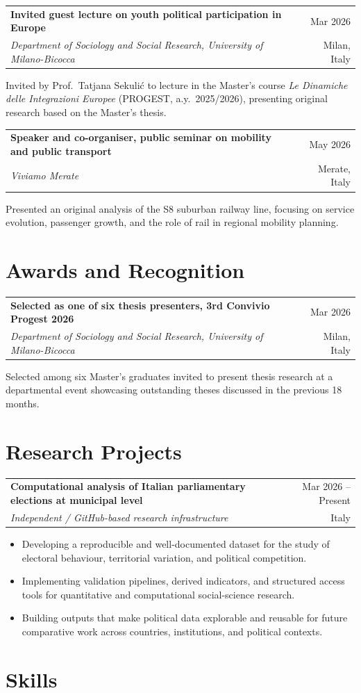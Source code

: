 \documentclass[11pt,a4paper]{article}
\makeatletter
\newcommand{\cventry}[4]{%
  \begin{tabularx}{\textwidth}{@{}Xr@{}}
    {\textbf{#1}} & {#4}\\
    {\emph{#2}} & {#3}
  \end{tabularx}\vspace{0.2em}
}
\makeatother
\begin{document}
\cventry{Invited guest lecture on youth political participation in Europe}{Department of Sociology and Social Research, University of Milano-Bicocca}{Milan, Italy}{Mar 2026}
Invited by Prof.~Tatjana Sekuli\'c to lecture in the Master's course \emph{Le Dinamiche delle Integrazioni Europee} (PROGEST, a.y.~2025/2026), presenting original research based on the Master's thesis.

\cventry{Speaker and co-organiser, public seminar on mobility and public transport}{Viviamo Merate}{Merate, Italy}{May 2026}
Presented an original analysis of the S8 suburban railway line, focusing on service evolution, passenger growth, and the role of rail in regional mobility planning.

\section*{Awards and Recognition}

\cventry{Selected as one of six thesis presenters, 3rd Convivio Progest 2026}{Department of Sociology and Social Research, University of Milano-Bicocca}{Milan, Italy}{Mar 2026}
Selected among six Master's graduates invited to present thesis research at a departmental event showcasing outstanding theses discussed in the previous 18 months.

\section*{Research Projects}

\cventry{Computational analysis of Italian parliamentary elections at municipal level}{Independent / GitHub-based research infrastructure}{Italy}{Mar 2026 -- Present}
\begin{itemize}
  \item Developing a reproducible and well-documented dataset for the study of electoral behaviour, territorial variation, and political competition.
  \item Implementing validation pipelines, derived indicators, and structured access tools for quantitative and computational social-science research.
  \item Building outputs that make political data explorable and reusable for future comparative work across countries, institutions, and political contexts.
\end{itemize}

\section*{Skills}
\end{document}
